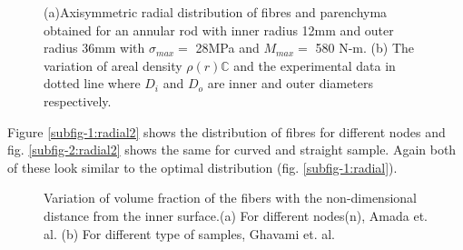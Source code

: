 \documentclass[10pt]{article}
\begin{document}
\begin{figure}[H]
\begin{center}
{     }
\caption{(a)Axisymmetric radial distribution of fibres and parenchyma obtained for an annular rod with inner radius 12mm and outer radius 36mm with $\sigma_{max} = $ 28MPa and $M_{max} = $ 580 N-m. (b) The variation of areal density $\rho(r)\mathbb{C}$ and the experimental data in dotted line where $D_i$ and $D_o$ are inner and outer diameters respectively. \cite{mannan2017correlations}}
\label{fig:radial}
\end{center}
\end{figure}
\par 
Figure \ref{subfig-1:radial2} shows the distribution of fibres for different nodes and fig. \ref{subfig-2:radial2} shows the same for curved and straight sample. Again both of these look similar to the optimal distribution (fig. \ref{subfig-1:radial}). 
\begin{figure}[H]
\begin{center}
	\caption{Variation of volume fraction of the fibers with the non-dimensional distance from the inner surface.(a) For different nodes(n), Amada et. al. \cite{amada1996mechanical} (b) For different type of samples, Ghavami et. al. \cite{ghavami2003bamboo}}
\label{fig:radial2}
\end{center}
\end{figure}
\end{document}
